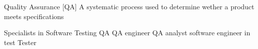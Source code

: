 Quality Assurance  [QA]
  A systematic process used to determine wether a product meets specifications 

Specialists in Software Testing
  QA 
  QA engineer 
  QA analyst  
  software engineer in test 
  Tester 